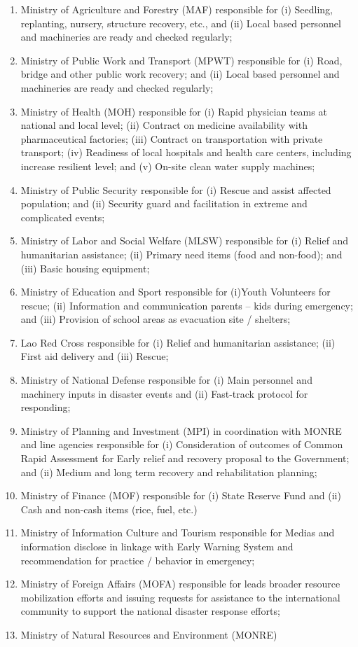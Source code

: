 \begin{enumerate}

\item Ministry of Agriculture and Forestry (MAF) responsible for (i) Seedling, replanting, nursery, structure recovery, etc., and  (ii) Local based personnel and machineries are ready and checked regularly;
\item Ministry of Public Work and Transport (MPWT) responsible for (i) Road, bridge and other public work recovery; and (ii) Local based personnel and machineries are ready and checked regularly; 
\item Ministry of Health (MOH) responsible for (i) Rapid physician teams at national and local level; (ii) Contract on medicine availability with pharmaceutical factories; (iii) Contract on transportation with private transport; (iv) Readiness of local hospitals and health care centers, including increase resilient level; and (v) On-site clean water supply machines;
\item Ministry of Public Security responsible for (i) Rescue and assist affected population; and (ii) Security guard and facilitation in extreme and complicated events;
\item Ministry of Labor and Social Welfare (MLSW) responsible for (i) Relief and humanitarian assistance; (ii) Primary need items (food and non-food); and (iii) Basic housing equipment;
\item Ministry of Education and Sport responsible for (i)Youth Volunteers for rescue; (ii) Information and communication  parents – kids during emergency; and (iii) Provision of school areas as  evacuation site / shelters;
\item Lao Red Cross responsible for (i) Relief and humanitarian assistance; (ii) First aid delivery and (iii) Rescue;
\item Ministry of National Defense responsible for (i) Main personnel and machinery inputs in disaster events and (ii) Fast-track protocol for responding;
\item Ministry of Planning and Investment (MPI) in coordination with MONRE and line agencies responsible for (i) Consideration of outcomes of Common Rapid Assessment for Early relief and recovery proposal to the Government; and (ii) Medium and long term recovery and rehabilitation planning;
\item Ministry of Finance (MOF) responsible for (i) State Reserve Fund and (ii) Cash and non-cash items (rice, fuel, etc.)
\item Ministry of Information Culture and Tourism responsible for Medias and information disclose in linkage with Early Warning System and recommendation for practice / behavior in emergency;
\item Ministry of Foreign Affairs (MOFA) responsible for leads broader resource mobilization efforts and issuing requests for assistance to the international community to support the national disaster response efforts;
\item Ministry of Natural Resources and Environment (MONRE) 


\end{enumerate}
